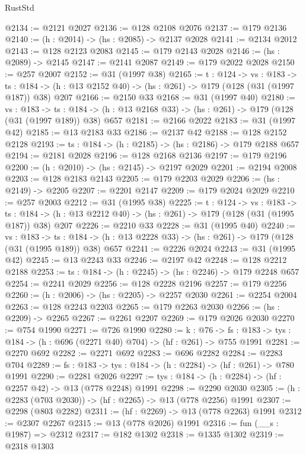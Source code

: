 \begin{lexlean}{RustStd}
\begin{coremodule}
{\begin{coremodule}
{{{{{@2134 := @2121 @2027
@2136 := @128 @2108 @2076
@2137 := @179 @2136
@2140 := (h : @2014) -> (hs : @2085) -> @2137 @2028
@2141 := @2134 @2012
@2143 := @128 @2123 @2083
@2145 := @179 @2143 @2028
@2146 := (hs : @2089) -> @2145
@2147 := @2141 @2087
@2149 := @179 @2022 @2028
@2150 := @257 @2007
@2152 := @31 (@1997 @38)
@2165 := {t : @124} ->
  {vs : @183} ->
  {ts : @184} -> (h : @13 @2152 @40) -> (hs : @261) -> @179 (@128 (@31 (@1997 @187)) @38) @207
@2166 := @2150 @33
@2168 := @31 (@1997 @40)
@2180 := {vs : @183} ->
  {ts : @184} -> (h : @13 @2168 @33) -> (hs : @261) -> @179 (@128 (@31 (@1997 @189)) @38) @657
@2181 := @2166 @2022
@2183 := @31 (@1997 @42)
@2185 := @13 @2183 @33
@2186 := @2137 @42
@2188 := @128 @2152 @2128
@2193 := {ts : @184} -> (h : @2185) -> (hs : @2186) -> @179 @2188 @657
@2194 := @2181 @2028
@2196 := @128 @2168 @2136
@2197 := @179 @2196
@2200 := (h : @2010) -> (hs : @2145) -> @2197 @2029
@2201 := @2194 @2008
@2203 := @128 @2183 @2143
@2205 := @179 @2203 @2029
@2206 := (hs : @2149) -> @2205
@2207 := @2201 @2147
@2209 := @179 @2024 @2029
@2210 := @257 @2003
@2212 := @31 (@1995 @38)
@2225 := {t : @124} ->
  {vs : @183} ->
  {ts : @184} -> (h : @13 @2212 @40) -> (hs : @261) -> @179 (@128 (@31 (@1995 @187)) @38) @207
@2226 := @2210 @33
@2228 := @31 (@1995 @40)
@2240 := {vs : @183} ->
  {ts : @184} -> (h : @13 @2228 @33) -> (hs : @261) -> @179 (@128 (@31 (@1995 @189)) @38) @657
@2241 := @2226 @2024
@2243 := @31 (@1995 @42)
@2245 := @13 @2243 @33
@2246 := @2197 @42
@2248 := @128 @2212 @2188
@2253 := {ts : @184} -> (h : @2245) -> (hs : @2246) -> @179 @2248 @657
@2254 := @2241 @2029
@2256 := @128 @2228 @2196
@2257 := @179 @2256
@2260 := (h : @2006) -> (hs : @2205) -> @2257 @2030
@2261 := @2254 @2004
@2263 := @128 @2243 @2203
@2265 := @179 @2263 @2030
@2266 := (hs : @2209) -> @2265
@2267 := @2261 @2207
@2269 := @179 @2026 @2030
@2270 := @754 @1990
@2271 := @726 @1990
@2280 := {k : @76} ->
  {fs : @183} -> {tys : @184} -> (h : @696 (@2271 @40) @704) -> (hf : @261) -> @755 @1991
@2281 := @2270 @692
@2282 := @2271 @692
@2283 := @696 @2282
@2284 := @2283 @704
@2289 := {fs : @183} -> {tys : @184} -> (h : @2284) -> (hf : @261) -> @780 @1991
@2290 := @2281 @2026
@2297 := {tys : @184} -> (h : @2284) -> (hf : @2257 @42) -> @13 (@778 @2248) @1991
@2298 := @2290 @2030
@2305 := (h : @2283 (@703 @2030)) -> (hf : @2265) -> @13 (@778 @2256) @1991
@2307 := @2298 (@803 @2282)
@2311 := (hf : @2269) -> @13 (@778 @2263) @1991
@2312 := @2307 @2267
@2315 := @13 (@778 @2026) @1991
@2316 := fun (__s : @1987) => @2312
@2317 := @182 @1302
@2318 := @1335 @1302
@2319 := @2318 @1303
}}}}}
\end{coremodule}}
\end{coremodule}
\end{lexlean}
